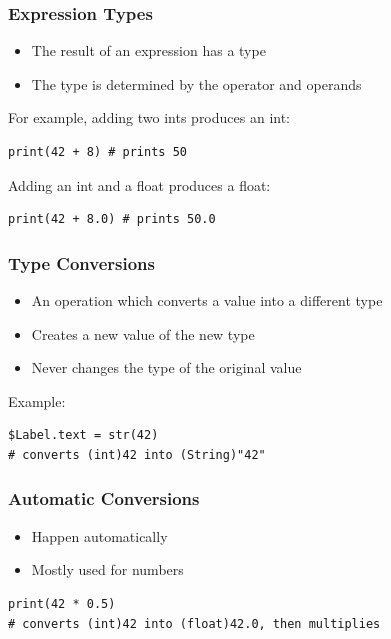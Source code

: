 \documentclass{beamer}
\newenvironment{xframe}[2][]
{
    \begin{frame}[fragile,environment=xframe,#1]
    \frametitle{#2}
}{
    \end{frame}
}
\begin{document}
\begin{xframe}{Expression Types}
    \begin{itemize}
        \item The result of an expression has a type
        \item The type is determined by the operator and operands
    \end{itemize}

    \pause
    \bigskip

    For example, adding two ints produces an int:
    \begin{verbatim}
print(42 + 8) # prints 50
    \end{verbatim}

    \pause
    \bigskip

    Adding an int and a float produces a float:
    \begin{verbatim}
print(42 + 8.0) # prints 50.0
    \end{verbatim}
\end{xframe}

\begin{xframe}{Type Conversions}
    \begin{itemize}
        \item An operation which converts a value into a different type
        \item Creates a new value of the new type
        \item Never changes the type of the original value
    \end{itemize}

    \pause
    \bigskip

    Example:
    \begin{verbatim}
$Label.text = str(42)
# converts (int)42 into (String)"42"
    \end{verbatim}

\end{xframe}

\begin{xframe}{Automatic Conversions}
    \begin{itemize}
        \item Happen automatically
        \item Mostly used for numbers
    \end{itemize}

    \pause
    \bigskip

    \begin{verbatim}
print(42 * 0.5)
# converts (int)42 into (float)42.0, then multiplies
    \end{verbatim}

\end{xframe}
\end{document}
